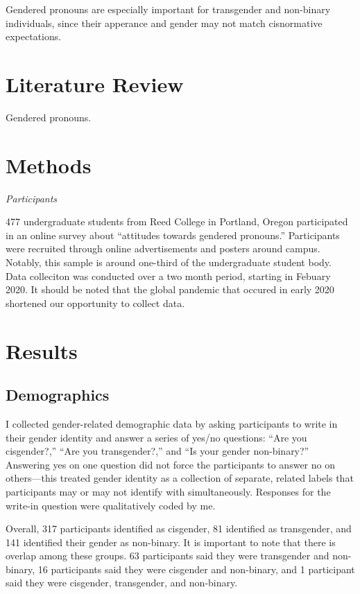 \documentclass[12pt,twoside]{reedthesis}
\begin{document}
Gendered pronouns are especially important for transgender and non-binary individuals, since their apperance and gender may not match cisnormative expectations.

\hypertarget{litreview}{%
\chapter{Literature Review}\label{litreview}}

Gendered pronouns.

\hypertarget{methods}{%
\chapter{Methods}\label{methods}}

\emph{Participants}

477 undergraduate students from Reed College in Portland, Oregon participated in an online survey about ``attitudes towards gendered pronouns.'' Participants were recruited through online advertisements and posters around campus. Notably, this sample is around one-third of the undergraduate student body. Data colleciton was conducted over a two month period, starting in Febuary 2020. It should be noted that the global pandemic that occured in early 2020 shortened our opportunity to collect data.

\hypertarget{results}{%
\chapter{Results}\label{results}}

\hypertarget{demographics}{%
\section{Demographics}\label{demographics}}

I collected gender-related demographic data by asking participants to write in their gender identity and answer a series of yes/no questions: ``Are you cisgender?,'' ``Are you transgender?,'' and ``Is your gender non-binary?'' Answering yes on one question did not force the participants to answer no on others---this treated gender identity as a collection of separate, related labels that participants may or may not identify with simultaneously. Responses for the write-in question were qualitatively coded by me.

Overall, 317 participants identified as cisgender, 81 identified as transgender, and 141 identified their gender as non-binary. It is important to note that there is overlap among these groups. 63 participants said they were transgender and non-binary, 16 participants said they were cisgender and non-binary, and 1 participant said they were cisgender, transgender, and non-binary.
\end{document}

